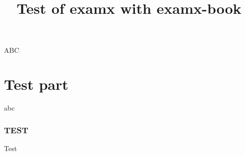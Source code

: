 \documentclass{article}
\title{Test of examx with examx-book}
\begin{document}
    \maketitle
    
    ABC
    
    
    \part{Test part}
    
    abc
    \section{TEST}
    Test
\end{document}
